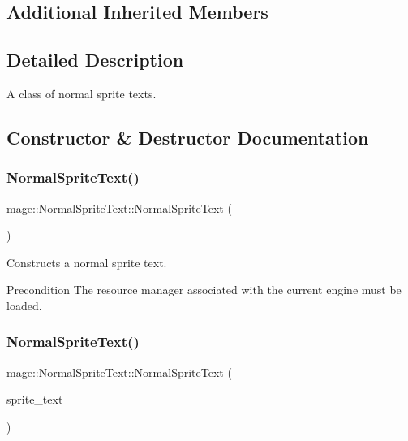 \subsection*{Additional Inherited Members}


\subsection{Detailed Description}
A class of normal sprite texts. 

\subsection{Constructor \& Destructor Documentation}
\hypertarget{classmage_1_1_normal_sprite_text_a1e932ddea2c5b96b0dc500c8cd7f09a7}{}\label{classmage_1_1_normal_sprite_text_a1e932ddea2c5b96b0dc500c8cd7f09a7} 
\subsubsection{\texorpdfstring{Normal\+Sprite\+Text()}{NormalSpriteText()}\hspace{0.1cm}{\footnotesize\ttfamily [1/3]}}
{\footnotesize\ttfamily mage\+::\+Normal\+Sprite\+Text\+::\+Normal\+Sprite\+Text (\begin{DoxyParamCaption}{ }\end{DoxyParamCaption})\hspace{0.3cm}{\ttfamily [default]}}

Constructs a normal sprite text.

\begin{DoxyPrecond}{Precondition}
The resource manager associated with the current engine must be loaded. 
\end{DoxyPrecond}
\hypertarget{classmage_1_1_normal_sprite_text_aa73a83a29b28d7b5f20240f3074e5d4d}{}\label{classmage_1_1_normal_sprite_text_aa73a83a29b28d7b5f20240f3074e5d4d} 
\subsubsection{\texorpdfstring{Normal\+Sprite\+Text()}{NormalSpriteText()}\hspace{0.1cm}{\footnotesize\ttfamily [2/3]}}
{\footnotesize\ttfamily mage\+::\+Normal\+Sprite\+Text\+::\+Normal\+Sprite\+Text (\begin{DoxyParamCaption}\item[{const \hyperlink{classmage_1_1_normal_sprite_text}{Normal\+Sprite\+Text} \&}]{sprite\+\_\+text }\end{DoxyParamCaption})\hspace{0.3cm}{\ttfamily [default]}}

